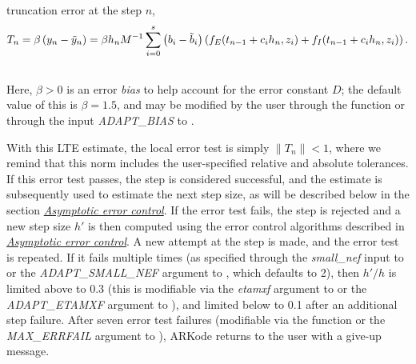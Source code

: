 \documentclass[letterpaper,10pt,english]{sphinxmanual}
\begin{document}
truncation error at the step $n$,
\label{Mathematics:equation-LTE}\begin{gather}
\begin{split}T_n = \beta \left(y_n - \tilde{y}_n\right) =
\beta h_n M^{-1} \sum_{i=0}^{s} \left(b_i - \tilde{b}_i\right)
\left(f_E(t_{n-1} + c_i h_n, z_i) + f_I(t_{n-1} + c_i h_n, z_i)\right).\end{split}\label{Mathematics-LTE}\\\begin{split}\end{split}\notag
\end{gather}
Here, $\beta>0$ is an error \emph{bias} to help account for the error
constant $D$; the default value of this is $\beta = 1.5$,
and may be modified by the user through the function
{\hyperref[c_interface/User_callable:ARKodeSetErrorBias]{}} or through the input \emph{ADAPT\_BIAS} to
{\hyperref[f_interface/Usage:f/_/FARKSETRIN]{}}.

With this LTE estimate, the local error test is simply $\|T_n\|
< 1$, where we remind that this norm includes the user-specified
relative and absolute tolerances.  If this error test passes, the step
is considered successful, and the estimate is subsequently used to
estimate the next step size, as will be described below in the section
{\hyperref[Mathematics:mathematics-adaptivity-errorcontrol]{\emph{Asymptotic error control}}}.  If the error test fails,
the step is rejected and a new step size $h'$ is then computed
using the error control algorithms described in
{\hyperref[Mathematics:mathematics-adaptivity-errorcontrol]{\emph{Asymptotic error control}}}.  A new attempt at the step
is made, and the error test is repeated.  If it fails multiple times
(as specified through the \emph{small\_nef} input to
{\hyperref[c_interface/User_callable:ARKodeSetSmallNumEFails]{}} or the \emph{ADAPT\_SMALL\_NEF} argument
to {\hyperref[f_interface/Usage:f/_/FARKSETIIN]{}}, which defaults to 2), then
$h'/h$ is limited above to 0.3 (this is modifiable via the
\emph{etamxf} argument to {\hyperref[c_interface/User_callable:ARKodeSetMaxEFailGrowth]{}} or the
\emph{ADAPT\_ETAMXF} argument to {\hyperref[f_interface/Usage:f/_/FARKSETRIN]{}}), and
limited below to 0.1 after an additional step failure.  After
seven error test failures (modifiable via the function
{\hyperref[c_interface/User_callable:ARKodeSetMaxErrTestFails]{}} or the \emph{MAX\_ERRFAIL} argument to
{\hyperref[f_interface/Usage:f/_/FARKSETIIN]{}}), ARKode returns to the user with a give-up
message.
\end{document}
